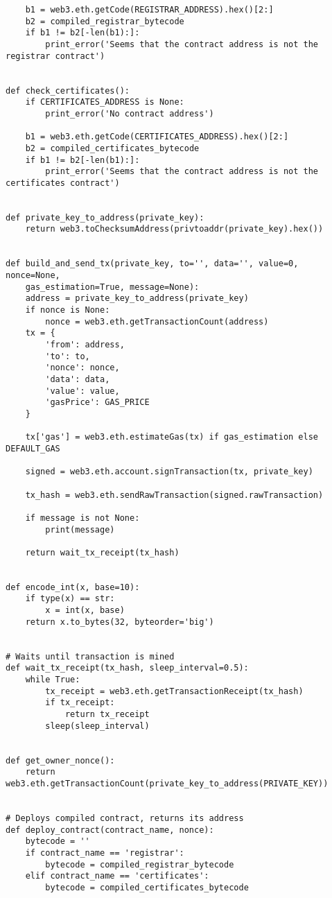 \begin{verbatim}
    b1 = web3.eth.getCode(REGISTRAR_ADDRESS).hex()[2:]
    b2 = compiled_registrar_bytecode
    if b1 != b2[-len(b1):]:
        print_error('Seems that the contract address is not the registrar contract')


def check_certificates():
    if CERTIFICATES_ADDRESS is None:
        print_error('No contract address')

    b1 = web3.eth.getCode(CERTIFICATES_ADDRESS).hex()[2:]
    b2 = compiled_certificates_bytecode
    if b1 != b2[-len(b1):]:
        print_error('Seems that the contract address is not the certificates contract')


def private_key_to_address(private_key):
    return web3.toChecksumAddress(privtoaddr(private_key).hex())


def build_and_send_tx(private_key, to='', data='', value=0, nonce=None, 
    gas_estimation=True, message=None):
    address = private_key_to_address(private_key)
    if nonce is None:
        nonce = web3.eth.getTransactionCount(address)
    tx = {
        'from': address,
        'to': to,
        'nonce': nonce,
        'data': data,
        'value': value,
        'gasPrice': GAS_PRICE
    }

    tx['gas'] = web3.eth.estimateGas(tx) if gas_estimation else DEFAULT_GAS

    signed = web3.eth.account.signTransaction(tx, private_key)

    tx_hash = web3.eth.sendRawTransaction(signed.rawTransaction)

    if message is not None:
        print(message)

    return wait_tx_receipt(tx_hash)


def encode_int(x, base=10):
    if type(x) == str:
        x = int(x, base)
    return x.to_bytes(32, byteorder='big')


# Waits until transaction is mined
def wait_tx_receipt(tx_hash, sleep_interval=0.5):
    while True:
        tx_receipt = web3.eth.getTransactionReceipt(tx_hash)
        if tx_receipt:
            return tx_receipt
        sleep(sleep_interval)


def get_owner_nonce():
    return web3.eth.getTransactionCount(private_key_to_address(PRIVATE_KEY))


# Deploys compiled contract, returns its address
def deploy_contract(contract_name, nonce):
    bytecode = ''
    if contract_name == 'registrar':
        bytecode = compiled_registrar_bytecode
    elif contract_name == 'certificates':
        bytecode = compiled_certificates_bytecode


\end{verbatim}
